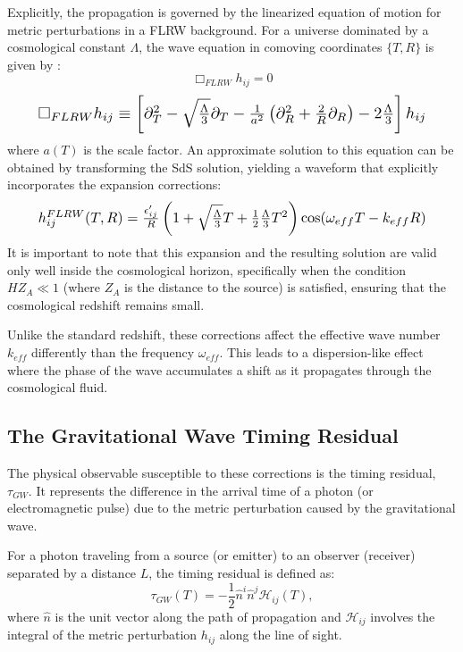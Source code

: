 \documentclass[twocolumn]{revtex4-2}
\begin{document}
Explicitly, the propagation is governed by the linearized equation of motion for metric perturbations in a FLRW background. For a universe dominated by a cosmological constant $\Lambda$, the wave equation in comoving coordinates $\{T, R\}$ is given by \cite{espriu2021}:
\begin{equation}
\Box_{FLRW}h_{ij}=0
\label{eq:wave_eq_FLRW}
\end{equation}
\begin{equation}
\resizebox{0.9\hsize}{!}{$ %
\Box_{FLRW}h_{ij} \equiv \left[\partial_{T}^{2}-\sqrt{\frac{\Lambda}{3}}\partial_{T}-\frac{1}{a^{2}}\left(\partial_{R}^{2}+\frac{2}{R}\partial_{R}\right)-2\frac{\Lambda}{3}\right]h_{ij}
$}
\label{eq:wave_eq_FLRW}
\end{equation}
where $a(T)$ is the scale factor. An approximate solution to this equation can be obtained by transforming the SdS solution, yielding a waveform that explicitly incorporates the expansion corrections:
\begin{equation}
\resizebox{0.9\hsize}{!}{$
h_{ij}^{FLRW}(T,R)=\frac{\epsilon_{ij}^{\prime}}{R}\left(1+\sqrt{\frac{\Lambda}{3}}T+\frac{1}{2}\frac{\Lambda}{3}T^{2}\right)\cos(\omega_{eff}T-k_{eff}R)$}
\label{eq:solution_FLRW}
\end{equation}
It is important to note that this expansion and the resulting solution are valid only well inside the cosmological horizon, specifically when the condition $H Z_A \ll 1$ (where $Z_A$ is the distance to the source) is satisfied, ensuring that the cosmological redshift remains small.

Unlike the standard redshift, these corrections affect the effective wave number $k_{eff}$ differently than the frequency $\omega_{eff}$. This leads to a dispersion-like effect where the phase of the wave accumulates a shift as it propagates through the cosmological fluid.

\subsection{The Gravitational Wave Timing Residual}
The physical observable susceptible to these corrections is the timing residual, $\tau_{GW}$. It represents the difference in the arrival time of a photon (or electromagnetic pulse) due to the metric perturbation caused by the gravitational wave.

For a photon traveling from a source (or emitter) to an observer (receiver) separated by a distance $L$, the timing residual is defined as:
\begin{equation}
\tau_{GW}(T) = -\frac{1}{2} \hat{n}^i \hat{n}^j \mathcal{H}_{ij}(T),
\label{eq:tau_def}
\end{equation}
where $\hat{n}$ is the unit vector along the path of propagation and $\mathcal{H}_{ij}$ involves the integral of the metric perturbation $h_{ij}$ along the line of sight.
\end{document}
